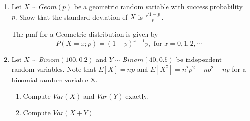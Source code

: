 \documentclass[
]{article}
\providecommand{\tightlist}{%
  \setlength{\itemsep}{0pt}\setlength{\parskip}{0pt}}
\begin{document}
\begin{enumerate}
\def\labelenumi{\arabic{enumi}.}
\item
  Let \(X \sim Geom(p)\) be a geometric random variable with success probability \(p\). Show that the standard deviation of \(X\) is \(\displaystyle \frac{\sqrt{1-p}}{p}\).

  The pmf for a Geometric distribution is given by
  \[P(X = x; p) = (1-p)^{x-1} p, \text{ for } x=0,1,2, \cdots\]
\item
  Let \(X \sim Binom(100,0.2)\) and \(Y \sim Binom(40,0.5)\) be independent random variables. Note that \(E[X] = np\) and \(E[X^2] = n^2p^2 - np^2 + np\) for a binomial random variable X.

  \begin{enumerate}
  \def\labelenumii{\alph{enumii}.}
  \tightlist
  \item
    Compute \(Var(X)\) and \(Var(Y)\) exactly.
  \item
    Compute \(Var(X + Y)\)
  \end{enumerate}
\end{enumerate}
\end{document}
